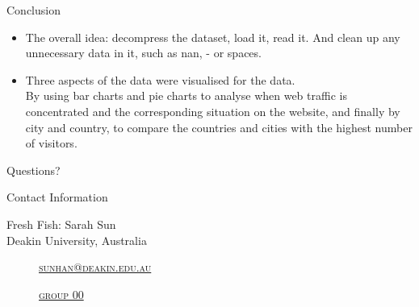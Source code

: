 \documentclass[
 size=14pt,
 paper=smartboard,  %
 mode=present, 		%
 display=slides, 	%
 style=tuliplab,  	%
 pauseslide,
 fleqn,leqno]{powerdot}
\begin{document}
\begin{slide}[toc=,bm=]{Conclusion}
\begin{itemize}
\item
\smallskip
The overall idea: decompress the dataset, load it, read it. And clean up any unnecessary data in it, such as nan, - or spaces.

\item
\smallskip
Three aspects of the data were visualised for the data.\\

By using bar charts and pie charts to analyse when web traffic is concentrated and the corresponding situation on the website, and finally by city and country, to compare the countries and cities with the highest number of visitors.

\end{itemize}



\end{slide}


%
\begin{slide}[toc=,bm=]{Questions?}
\begin{center}
\begin{figure}
\end{figure}
\end{center}
\end{slide}


\begin{wideslide}[toc=,bm=]{Contact Information}
\centering
{}
\twocolumn[
lcolwidth=0.35\linewidth,
rcolwidth=0.65\linewidth
]
{
}
{
 Fresh Fish: Sarah Sun\\
Deakin University, Australia
\begin{description}
 \item[\textcolor{orange}{\faEnvelope}] \href{mailto:sunhan@deakin.edu.au}
 {\textsc{\footnotesize{sunhan@deakin.edu.au}}}

 \item[\textcolor{orange}{\faHome}] \href{http://www.tulip.org.au}
 {\textsc{\footnotesize{group 00}}}
\end{description}
}
\end{wideslide}
\end{document}

